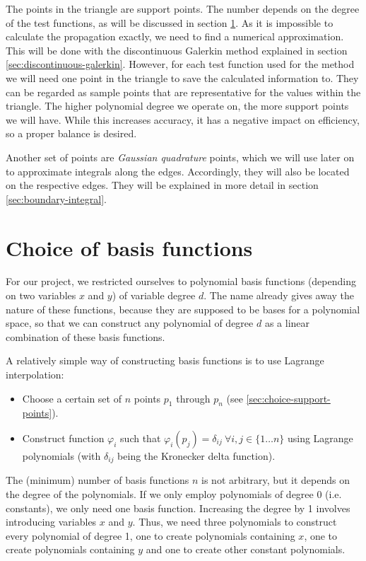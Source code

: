 \documentclass{article}
\renewcommand{\phi}{\varphi}
\begin{document}
The points in the triangle are support points. The number depends on the degree of the test functions, as will be discussed in section \ref{sec:basis-functions-choice}. As it is impossible to calculate the propagation exactly, we need to find a numerical approximation. This will be done with the discontinuous Galerkin method explained in section \ref{sec:discontinuous-galerkin}. However, for each test function used for the method we will need one point in the triangle to save the calculated information to. They can be regarded as sample points that are representative for the values within the triangle. The higher polynomial degree we operate on, the more support points we will have. While this increases accuracy, it has a negative impact on efficiency, so a proper balance is desired.

Another set of points are \emph{Gaussian quadrature} points, which we will use later on to approximate integrals along the edges. Accordingly, they will also be located on the respective edges. They will be explained in more detail in section \ref{sec:boundary-integral}.

\section{Choice of basis functions}
\label{sec:basis-functions-choice}

For our project, we restricted ourselves to polynomial basis functions (depending on two variables $x$ and $y$) of variable degree $d$. The name already gives away the nature of these functions, because they are supposed to be bases for a polynomial space, so that we can construct any polynomial of degree $d$ as a linear combination of these basis functions.

A relatively simple way of constructing basis functions is to use Lagrange interpolation:
\begin{itemize}
\item Choose a certain set of $n$ points $p_1$ through $p_n$ (see \ref{sec:choice-support-points}).
\item Construct function $\phi_i$ such that $\phi_i(p_j) = \delta_{ij} \  \forall i,j \in \{1 \dots n\}$ using Lagrange polynomials (with $\delta_{ij}$ being the Kronecker delta function).
\end{itemize}

The (minimum) number of basis functions $n$ is not arbitrary, but it depends on the degree of the polynomials. If we only employ polynomials of degree 0 (i.e.\,constants), we only need one basis function. Increasing the degree by 1 involves introducing variables $x$ and $y$. Thus, we need three polynomials to construct every polynomial of degree 1, one to create polynomials containing $x$, one to create polynomials containing $y$ and one to create other constant polynomials.
\end{document}
